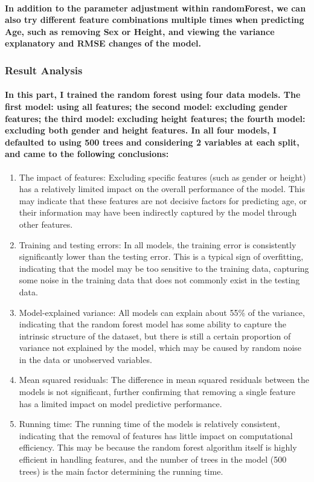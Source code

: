 \documentclass[11pt]{article} %
\begin{document}
\paragraph{In addition to the parameter adjustment within randomForest, we can also try different feature combinations multiple times when predicting Age, such as removing Sex or Height, and viewing the variance explanatory and RMSE changes of the model.}
% 
% 
% 
\subsubsection{Result Analysis}
\paragraph{In this part, I trained the random forest using four data models. The first model: using all features; the second model: excluding gender features; the third model: excluding height features; the fourth model: excluding both gender and height features. In all four models, I defaulted to using 500 trees and considering 2 variables at each split, and came to the following conclusions:}
\begin{enumerate}
    \item The impact of features: Excluding specific features (such as gender or height) has a relatively limited impact on the overall performance of the model. This may indicate that these features are not decisive factors for predicting age, or their information may have been indirectly captured by the model through other features.
    \item Training and testing errors: In all models, the training error is consistently significantly lower than the testing error. This is a typical sign of overfitting, indicating that the model may be too sensitive to the training data, capturing some noise in the training data that does not commonly exist in the testing data.
    \item Model-explained variance: All models can explain about 55\% of the variance, indicating that the random forest model has some ability to capture the intrinsic structure of the dataset, but there is still a certain proportion of variance not explained by the model, which may be caused by random noise in the data or unobserved variables.
    \item Mean squared residuals: The difference in mean squared residuals between the models is not significant, further confirming that removing a single feature has a limited impact on model predictive performance.
    \item Running time: The running time of the models is relatively consistent, indicating that the removal of features has little impact on computational efficiency. This may be because the random forest algorithm itself is highly efficient in handling features, and the number of trees in the model (500 trees) is the main factor determining the running time.
\end{enumerate}
% 
% 
\end{document}
